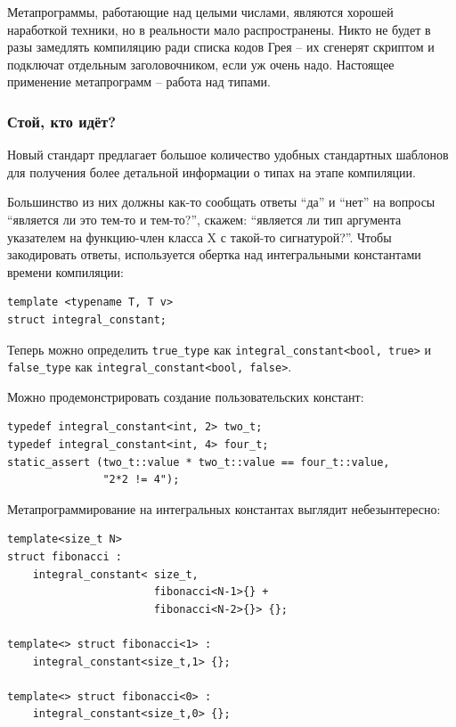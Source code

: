 \documentclass[a4paper,12pt,oneside]{article}
\begin{document}
Метапрограммы, работающие над целыми числами, являются хорошей наработкой техники, но в реальности мало распространены. Никто не будет в разы замедлять компиляцию ради списка кодов Грея -- их сгенерят скриптом и подключат отдельным заголовочником, если уж очень надо. Настоящее применение метапрограмм -- работа над типами.

\subsubsection{Стой, кто идёт?}\label{TypeTraits}

Новый стандарт предлагает большое количество удобных стандартных шаблонов для получения более детальной информации о типах на этапе компиляции. 

Большинство из них должны как-то сообщать ответы ``да'' и ``нет'' на вопросы ``является ли это тем-то и тем-то?'', скажем: ``является ли тип аргумента указателем на функцию-член класса X с такой-то сигнатурой?''. Чтобы закодировать ответы, используется обертка над интегральными константами времени компиляции:

\begin{lstlisting}
template <typename T, T v>
struct integral_constant;
\end{lstlisting}

Теперь можно определить \lstinline!true_type! как \lstinline!integral_constant<bool, true>! и \lstinline!false_type! как \lstinline!integral_constant<bool, false>!.

Можно продемонстрировать создание пользовательских констант:

\begin{lstlisting}
typedef integral_constant<int, 2> two_t;
typedef integral_constant<int, 4> four_t;
static_assert (two_t::value * two_t::value == four_t::value, 
               "2*2 != 4");
\end{lstlisting}

Метапрограммирование на интегральных константах выглядит небезынтересно:

\begin{lstlisting}
template<size_t N>
struct fibonacci : 
    integral_constant< size_t, 
                       fibonacci<N-1>{} + 
                       fibonacci<N-2>{}> {};

template<> struct fibonacci<1> : 
    integral_constant<size_t,1> {};

template<> struct fibonacci<0> : 
    integral_constant<size_t,0> {};
\end{lstlisting}
\end{document}
